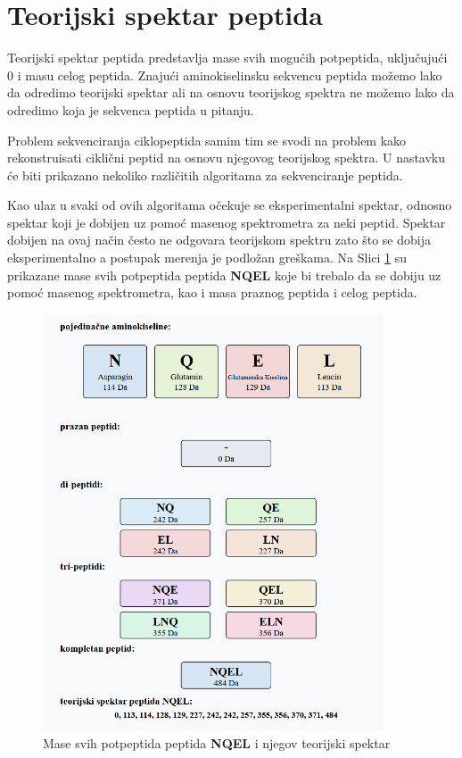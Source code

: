 \documentclass[12pt,oneside]{memoir}
\begin{document}
\section{Teorijski spektar peptida}
Teorijski spektar peptida predstavlja mase svih mogućih potpeptida, uključujući 0 i masu celog peptida. Znajući aminokiselinsku sekvencu peptida možemo lako da odredimo teorijski spektar ali na osnovu teorijskog spektra ne možemo lako da odredimo koja je sekvenca peptida u pitanju.

Problem sekvenciranja ciklopeptida samim tim se svodi na problem kako rekonstruisati ciklični peptid na osnovu njegovog teorijskog spektra. U nastavku će biti prikazano nekoliko različitih algoritama za sekvenciranje peptida.

Kao ulaz u svaki od ovih algoritama očekuje se eksperimentalni spektar, odnosno spektar koji je dobijen uz pomoć masenog spektrometra za neki peptid. Spektar dobijen na ovaj način često ne odgovara teorijskom spektru zato što se dobija eksperimentalno a postupak merenja je podložan greškama. Na Slici \ref{fig:spektar} su prikazane mase svih potpeptida peptida \textbf{NQEL} koje bi trebalo da se dobiju uz pomoć masenog spektrometra, kao i masa praznog peptida i celog peptida.

\begin{figure}[h]
  \centering
  \includegraphics[width=0.9\textwidth]{images/peptide-theoretical-spectrum.png}
  \caption{Mase svih potpeptida peptida \textbf{NQEL} i njegov teorijski spektar}
  \label{fig:spektar}
\end{figure}
\end{document}
